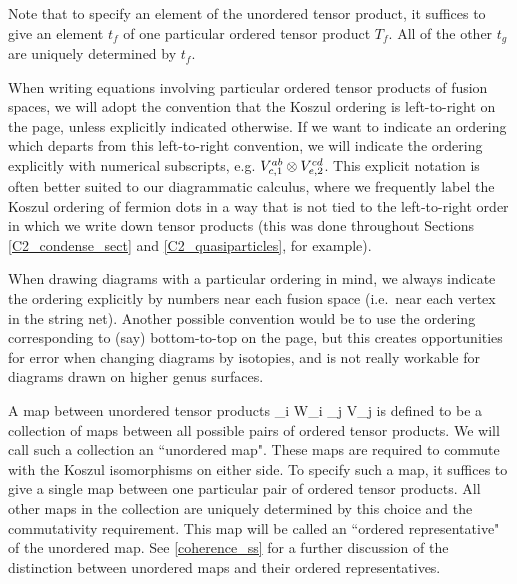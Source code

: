 Note that to specify an element of the unordered tensor product, it suffices to give an element $t_f$ of one
particular ordered tensor product $T_f$.
All of the other $t_g$ are uniquely determined by $t_f$.

When writing equations involving particular ordered tensor products of fusion spaces, we will adopt the 
convention that the Koszul ordering is left-to-right on the page, unless explicitly 
indicated otherwise. If we want to indicate an ordering which departs from this left-to-right convention, 
we will indicate the ordering explicitly with numerical subscripts, 
e.g. $V^{ab}_{c,1} \otimes V^{cd}_{e,2}$.
This explicit notation is often better suited to our diagrammatic calculus, where 
we frequently label the Koszul ordering of fermion dots in a way that is not tied to the 
left-to-right order in which we write down tensor products (this was done throughout Sections
\ref{C2_condense_sect} and \ref{C2_quasiparticles}, for example). 

When drawing diagrams with a particular ordering in mind, we always indicate the ordering explicitly by numbers near each fusion space (i.e.\ near
each vertex in the string net).
Another possible convention would be to use the ordering corresponding to (say) bottom-to-top on the page,
but this creates opportunities for error when changing diagrams by isotopies,
and is not really workable for diagrams drawn on higher genus surfaces.

A map between unordered tensor products
\be
	\bigotimes_i W_i \; \to \; \bigotimes_j V_j
\ee
is defined to be a collection of maps between
all possible pairs of ordered tensor products.
We will call such a collection an ``unordered map".
These maps are required to commute with the Koszul isomorphisms on either side.
To specify such a map, it suffices to give a single map between one particular pair of ordered tensor products.
All other maps in the collection are uniquely determined by this choice and the commutativity requirement.
This map will be called an ``ordered representative" of the unordered map.
See \ref{coherence_ss} for a further discussion of the distinction between unordered maps and
their ordered representatives.





